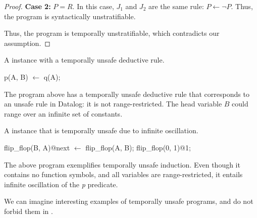 \begin{proof}
{\bf Case 2: }$P = R$.  In this case, $J_1$ and $J_2$ are the same rule: $P
\leftarrow \lnot P$.  Thus, the program is syntactically unstratifiable.

Thus, the program is temporally unstratifiable, which contradicts our
assumption.
%
\end{proof}

\begin{example}
A \slang instance with a temporally unsafe deductive rule.


\begin{Dedalus}
p(A, B) \(\leftarrow\) q(A);
\end{Dedalus}

The program above has a temporally unsafe deductive rule that corresponds to an
unsafe rule in Datalog: it is not range-restricted.  The head variable $B$
could range over an infinite set of constants.
\end{example}


\begin{example} 
%
A \slang instance that is temporally unsafe due to infinite oscillation.

\begin{Dedalus}
flip\_flop(B, A)@next \(\leftarrow\) flip\_flop(A, B);
flip\_flop(0, 1)@1;
\end{Dedalus}

The above program exemplifies temporally unsafe induction. Even though it
contains no function symbols, and all variables are range-restricted, it
entails infinite oscillation of the \emph{p} predicate.  
\end{example}

We can imagine interesting examples of temporally unsafe programs, and do not forbid them
in \slang. 



